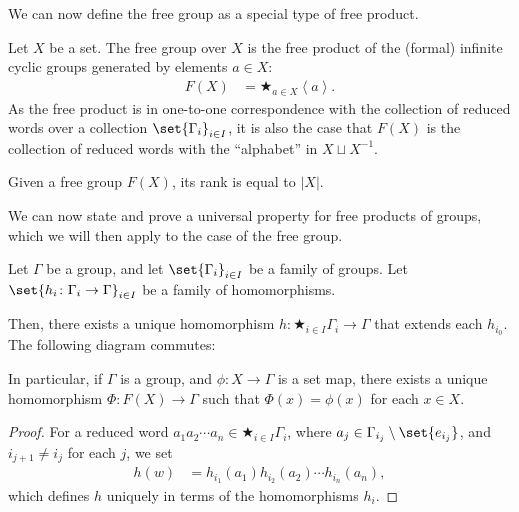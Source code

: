 We can now define the free group as a special type of free product.
\begin{definition}
  Let $X$ be a set. The {free group} over $X$ is the free product of the (formal) infinite cyclic groups generated by elements $a\in X$:
  \begin{align*}
    F(X) &= \bigstar_{a\in X}\left\langle a \right\rangle.
  \end{align*}
  As the free product is in one-to-one correspondence with the collection of reduced words over a collection $\set{\Gamma_i}_{i\in I}$, it is also the case that $F(X)$ is the collection of reduced words with the ``alphabet'' in $X\sqcup X^{-1}$.\newline

  Given a free group $F(X)$, its rank is equal to $\left\vert X \right\vert$.\label{def:free_group_as_product}
\end{definition}
We can now state and prove a universal property for free products of groups, which we will then apply to the case of the free group.
\begin{theorem}
  Let $\Gamma$ be a group, and let $\set{\Gamma_{i}}_{i\in I}$ be a family of groups. Let $\set{h_i\colon \Gamma_i\rightarrow \Gamma}_{i\in I}$ be a family of homomorphisms.\newline

  Then, there exists a unique homomorphism $h\colon \bigstar_{i\in I}\Gamma_i \rightarrow \Gamma$ that extends each $h_{i_{0}}$. The following diagram commutes:
  \begin{center}
  \end{center}
  In particular, if $\Gamma$ is a group, and $\phi\colon X\rightarrow \Gamma$ is a set map, there exists a unique homomorphism $\Phi\colon F(X)\rightarrow \Gamma$ such that $\Phi(x) = \phi(x)$ for each $x\in X$.
\end{theorem}
\begin{proof}
  For a reduced word $a_1a_2\cdots a_n\in \bigstar_{i\in I}\Gamma_i$, where $a_j\in \Gamma_{i_j}\setminus \set{e_{i_j}}$, and $i_{j+1} \neq i_j$ for each $j$, we set
  \begin{align*}
    h\left(w\right) &= h_{i_1}\left(a_1\right)h_{i_2}\left(a_2\right)\cdots h_{i_n}\left(a_n\right),
  \end{align*}
  which defines $h$ uniquely in terms of the homomorphisms $h_{i}$.
\end{proof}
